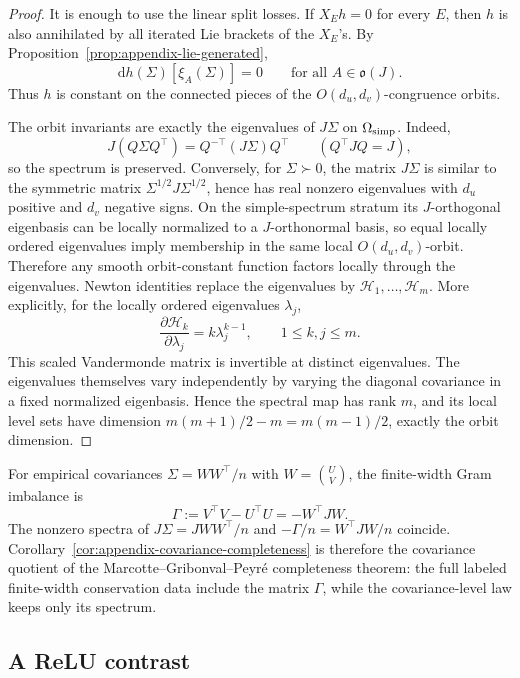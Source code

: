\begin{proof}
It is enough to use the linear split losses.  If \(X_Eh=0\) for every \(E\),
then \(h\) is also annihilated by all iterated Lie brackets of the \(X_E\)'s.
By Proposition~\ref{prop:appendix-lie-generated},
\[
\mathrm{d}h(\Sigma)[\xi_A(\Sigma)]=0
\qquad\text{for all }A\in\mathfrak o(J).
\]
Thus \(h\) is constant on the connected pieces of the
\(O(d_u,d_v)\)-congruence orbits.

The orbit invariants are exactly the eigenvalues of \(J\Sigma\) on
\(\Omega_{\rm simp}\).  Indeed,
\[
J(Q\Sigma Q^\top)=Q^{-\top}(J\Sigma)Q^\top
\qquad(Q^\top JQ=J),
\]
so the spectrum is preserved.  Conversely, for \(\Sigma\succ0\), the matrix
\(J\Sigma\) is similar to the symmetric matrix
\(\Sigma^{1/2}J\Sigma^{1/2}\), hence has real nonzero eigenvalues with
\(d_u\) positive and \(d_v\) negative signs.  On the simple-spectrum stratum
its \(J\)-orthogonal eigenbasis can be locally normalized to a
\(J\)-orthonormal basis, so equal locally ordered eigenvalues imply membership
in the same local \(O(d_u,d_v)\)-orbit.  Therefore any smooth orbit-constant
function factors locally through the eigenvalues.  Newton identities replace
the eigenvalues by \(\mathcal H_1,\ldots,\mathcal H_m\).
More explicitly, for the locally ordered eigenvalues \(\lambda_j\),
\[
 \frac{\partial\mathcal H_k}{\partial\lambda_j}
 =k\lambda_j^{k-1},\qquad 1\le k,j\le m.
\]
This scaled Vandermonde matrix is invertible at distinct eigenvalues.
The eigenvalues themselves vary independently by varying the diagonal
covariance in a fixed normalized eigenbasis. Hence the spectral map has
rank \(m\), and its local level sets have dimension
\(m(m+1)/2-m=m(m-1)/2\), exactly the orbit dimension.
\end{proof}

For empirical covariances \(\Sigma=WW^\top/n\) with
\(W=\binom{U}{V}\), the finite-width Gram imbalance is
\[
\Gamma:=V^\top V-U^\top U=-W^\top JW.
\]
The nonzero spectra of \(J\Sigma=JWW^\top/n\) and
\(-\Gamma/n=W^\top JW/n\) coincide.  Corollary~\ref{cor:appendix-covariance-completeness}
is therefore the covariance quotient of the Marcotte--Gribonval--Peyr\'e
completeness theorem: the full labeled finite-width conservation data include the matrix
\(\Gamma\), while the covariance-level law keeps only its spectrum.

\subsection{A ReLU contrast}

